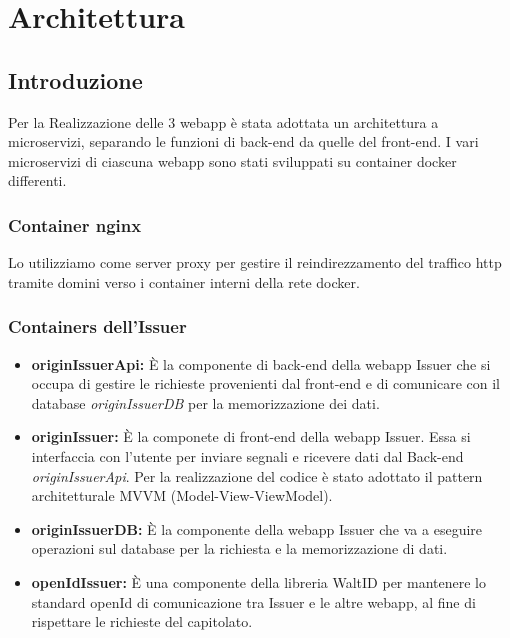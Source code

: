 \section{Architettura}

\subsection{Introduzione}
Per la Realizzazione delle 3 webapp è stata adottata un architettura a microservizi, separando le funzioni di back-end da quelle del front-end. I vari microservizi di ciascuna webapp sono stati sviluppati su container docker differenti.
\subsubsection{Container \textbf{nginx}}
Lo utilizziamo come server proxy per gestire il reindirezzamento del traffico http tramite domini verso i container interni della rete docker.
\subsubsection{Containers dell'\textbf{Issuer}}
\begin{itemize}
    \item \textbf{originIssuerApi:} È la componente di back-end della webapp Issuer che si occupa di gestire le richieste provenienti dal front-end e di comunicare con il database \textit{originIssuerDB} per la memorizzazione dei dati.
    \item \textbf{originIssuer:} È la componete di front-end della webapp Issuer. Essa si interfaccia con l'utente per inviare segnali e ricevere dati dal Back-end \textit{originIssuerApi}. Per la realizzazione del codice è stato adottato il pattern architetturale MVVM (Model-View-ViewModel).
    \item \textbf{originIssuerDB:} È la componente della webapp Issuer che va a eseguire operazioni sul database per la richiesta e la memorizzazione di dati. 
    \item \textbf{openIdIssuer:} È una componente della libreria WaltID per mantenere lo standard openId di comunicazione tra Issuer e le altre webapp, al fine di rispettare le richieste del capitolato.
\end{itemize}
